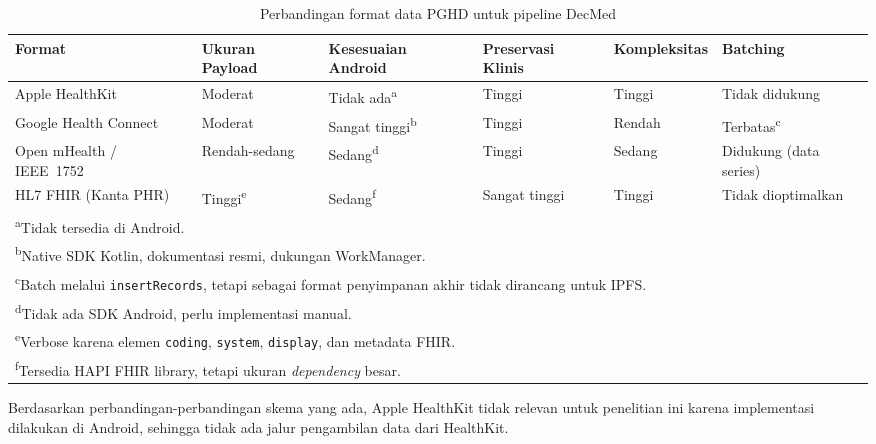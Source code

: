 \begin{table}[!ht]
  \centering
  \caption{Perbandingan format data PGHD untuk pipeline DecMed}\label{tab:perbandingan-format-pghd}
  \footnotesize  %
  \setlength{\tabcolsep}{3.5pt}  %
  \begin{tabular}{lp{2.2cm}p{2.2cm}p{1.8cm}p{2.2cm}p{1.8cm}}
    \toprule
    \textbf{Format} &
    \textbf{Ukuran Payload} &
    \textbf{Kesesuaian Android} &
    \textbf{Preservasi Klinis} &
    \textbf{Kompleksitas} &
    \textbf{Batching} \\
    \midrule
    Apple HealthKit
      & Moderat
      & Tidak ada\textsuperscript{a}
      & Tinggi
      & Tinggi
      & Tidak didukung \\[0.2cm]
    Google Health Connect
      & Moderat
      & Sangat tinggi\textsuperscript{b}
      & Tinggi
      & Rendah
      & Terbatas\textsuperscript{c} \\[0.2cm]
    Open mHealth / IEEE~1752
      & Rendah-sedang
      & Sedang\textsuperscript{d}
      & Tinggi
      & Sedang
      & Didukung (data series) \\[0.2cm]
    HL7 FHIR (Kanta PHR)
      & Tinggi\textsuperscript{e}
      & Sedang\textsuperscript{f}
      & Sangat tinggi
      & Tinggi
      & Tidak dioptimalkan \\[0.2cm]
    \bottomrule
    \multicolumn{6}{l}{\footnotesize\textsuperscript{a}Tidak tersedia di Android.} \\
    \multicolumn{6}{l}{\footnotesize\textsuperscript{b}Native SDK Kotlin, dokumentasi resmi, dukungan WorkManager.} \\
    \multicolumn{6}{l}{\footnotesize\textsuperscript{c}Batch melalui \texttt{insertRecords\(\)}, tetapi sebagai format penyimpanan akhir tidak dirancang untuk IPFS.} \\
    \multicolumn{6}{l}{\footnotesize\textsuperscript{d}Tidak ada SDK Android, perlu implementasi manual.} \\
    \multicolumn{6}{l}{\footnotesize\textsuperscript{e}Verbose karena elemen \texttt{coding}, \texttt{system}, \texttt{display}, dan metadata FHIR.} \\
    \multicolumn{6}{l}{\footnotesize\textsuperscript{f}Tersedia HAPI FHIR library, tetapi ukuran \textit{dependency} besar.} \\
  \end{tabular}
\end{table}

Berdasarkan perbandingan-perbandingan skema yang ada, Apple HealthKit tidak relevan untuk penelitian ini karena implementasi dilakukan di Android, sehingga tidak ada jalur pengambilan data dari HealthKit.

